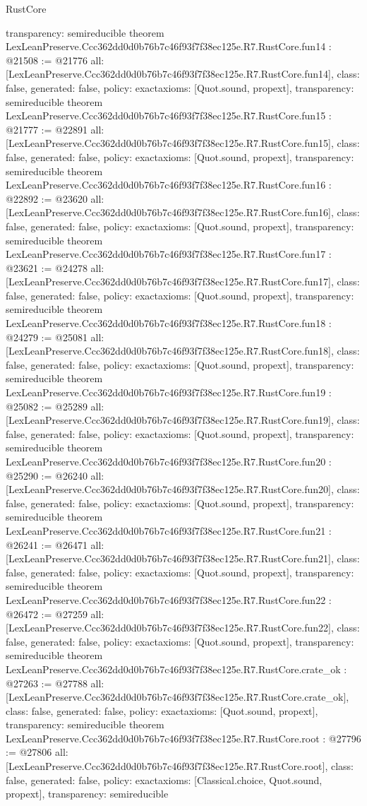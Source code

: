 \begin{lexlean}{RustCore}
\begin{coremodule}
{  transparency: semireducible
}
theorem LexLeanPreserve.Ccc362dd0d0b76b7c46f93f7f38ec125e.R7.RustCore.fun14 : @21508 := @21776 {
  all: [LexLeanPreserve.Ccc362dd0d0b76b7c46f93f7f38ec125e.R7.RustCore.fun14],
  class: false,
  generated: false,
  policy: exact{axioms: [Quot.sound, propext]},
  transparency: semireducible
}
theorem LexLeanPreserve.Ccc362dd0d0b76b7c46f93f7f38ec125e.R7.RustCore.fun15 : @21777 := @22891 {
  all: [LexLeanPreserve.Ccc362dd0d0b76b7c46f93f7f38ec125e.R7.RustCore.fun15],
  class: false,
  generated: false,
  policy: exact{axioms: [Quot.sound, propext]},
  transparency: semireducible
}
theorem LexLeanPreserve.Ccc362dd0d0b76b7c46f93f7f38ec125e.R7.RustCore.fun16 : @22892 := @23620 {
  all: [LexLeanPreserve.Ccc362dd0d0b76b7c46f93f7f38ec125e.R7.RustCore.fun16],
  class: false,
  generated: false,
  policy: exact{axioms: [Quot.sound, propext]},
  transparency: semireducible
}
theorem LexLeanPreserve.Ccc362dd0d0b76b7c46f93f7f38ec125e.R7.RustCore.fun17 : @23621 := @24278 {
  all: [LexLeanPreserve.Ccc362dd0d0b76b7c46f93f7f38ec125e.R7.RustCore.fun17],
  class: false,
  generated: false,
  policy: exact{axioms: [Quot.sound, propext]},
  transparency: semireducible
}
theorem LexLeanPreserve.Ccc362dd0d0b76b7c46f93f7f38ec125e.R7.RustCore.fun18 : @24279 := @25081 {
  all: [LexLeanPreserve.Ccc362dd0d0b76b7c46f93f7f38ec125e.R7.RustCore.fun18],
  class: false,
  generated: false,
  policy: exact{axioms: [Quot.sound, propext]},
  transparency: semireducible
}
theorem LexLeanPreserve.Ccc362dd0d0b76b7c46f93f7f38ec125e.R7.RustCore.fun19 : @25082 := @25289 {
  all: [LexLeanPreserve.Ccc362dd0d0b76b7c46f93f7f38ec125e.R7.RustCore.fun19],
  class: false,
  generated: false,
  policy: exact{axioms: [Quot.sound, propext]},
  transparency: semireducible
}
theorem LexLeanPreserve.Ccc362dd0d0b76b7c46f93f7f38ec125e.R7.RustCore.fun20 : @25290 := @26240 {
  all: [LexLeanPreserve.Ccc362dd0d0b76b7c46f93f7f38ec125e.R7.RustCore.fun20],
  class: false,
  generated: false,
  policy: exact{axioms: [Quot.sound, propext]},
  transparency: semireducible
}
theorem LexLeanPreserve.Ccc362dd0d0b76b7c46f93f7f38ec125e.R7.RustCore.fun21 : @26241 := @26471 {
  all: [LexLeanPreserve.Ccc362dd0d0b76b7c46f93f7f38ec125e.R7.RustCore.fun21],
  class: false,
  generated: false,
  policy: exact{axioms: [Quot.sound, propext]},
  transparency: semireducible
}
theorem LexLeanPreserve.Ccc362dd0d0b76b7c46f93f7f38ec125e.R7.RustCore.fun22 : @26472 := @27259 {
  all: [LexLeanPreserve.Ccc362dd0d0b76b7c46f93f7f38ec125e.R7.RustCore.fun22],
  class: false,
  generated: false,
  policy: exact{axioms: [Quot.sound, propext]},
  transparency: semireducible
}
theorem LexLeanPreserve.Ccc362dd0d0b76b7c46f93f7f38ec125e.R7.RustCore.crate_ok : @27263 := @27788 {
  all: [LexLeanPreserve.Ccc362dd0d0b76b7c46f93f7f38ec125e.R7.RustCore.crate_ok],
  class: false,
  generated: false,
  policy: exact{axioms: [Quot.sound, propext]},
  transparency: semireducible
}
theorem LexLeanPreserve.Ccc362dd0d0b76b7c46f93f7f38ec125e.R7.RustCore.root : @27796 := @27806 {
  all: [LexLeanPreserve.Ccc362dd0d0b76b7c46f93f7f38ec125e.R7.RustCore.root],
  class: false,
  generated: false,
  policy: exact{axioms: [Classical.choice, Quot.sound, propext]},
  transparency: semireducible
}


\end{coremodule}
\end{lexlean}
